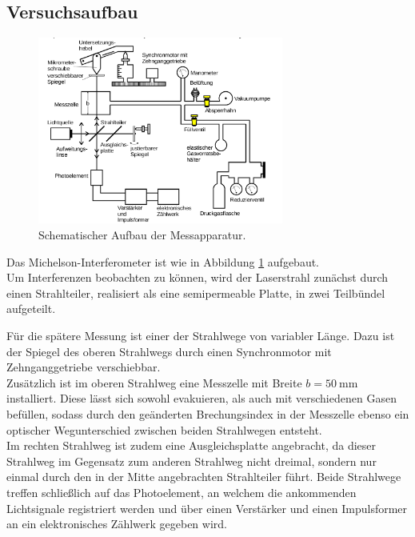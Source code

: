 \subsection{Versuchsaufbau}
\label{sec:Versuchsaufbau}
\begin{figure}
	\centering
	\includegraphics[width=0.72\textwidth]{Bilder/aufbau.png}
	\caption{Schematischer Aufbau der Messapparatur. \cite{Anleitung}}
  \label{fig:aufbau}
\end{figure}
Das Michelson-Interferometer ist wie in Abbildung \ref{fig:aufbau} aufgebaut.\\
Um Interferenzen beobachten zu können, wird der Laserstrahl zunächst durch einen Strahlteiler, realisiert als eine semipermeable Platte, in zwei Teilbündel aufgeteilt.

Für die spätere Messung ist einer der Strahlwege von variabler Länge. Dazu ist der Spiegel
des oberen Strahlwegs durch einen Synchronmotor mit Zehnganggetriebe verschiebbar.
\\Zusätzlich ist im oberen Strahlweg eine Messzelle mit Breite $b=\SI{50}{\milli\meter}$ installiert.
Diese lässt sich sowohl evakuieren, als auch mit verschiedenen Gasen befüllen, sodass durch den geänderten Brechungsindex in der Messzelle ebenso ein optischer Wegunterschied zwischen beiden Strahlwegen entsteht. \\
Im rechten Strahlweg ist zudem eine Ausgleichsplatte angebracht, da dieser Strahlweg im Gegensatz zum anderen Strahlweg nicht dreimal, sondern nur einmal durch den in der Mitte angebrachten Strahlteiler führt.
Beide Strahlwege treffen schließlich auf das Photoelement, an welchem die ankommenden Lichtsignale registriert werden und über einen Verstärker und einen Impulsformer an ein elektronisches Zählwerk gegeben wird.
